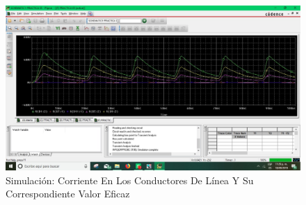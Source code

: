 \documentclass[10pt,a4paper]{article}
\begin{document}
\begin{figure}[hbtp]
\centering
\includegraphics[scale=0.2]{5.jpeg}
\caption{Simulación: Corriente En Los Conductores De Línea Y Su Correspondiente Valor Eficaz}
\end{figure}

\newpage
\end{document}
